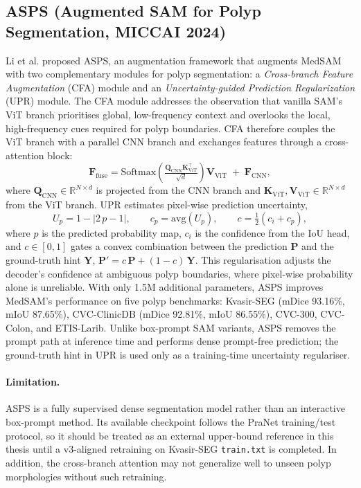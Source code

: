 \subsection{ASPS (Augmented SAM for Polyp Segmentation, MICCAI 2024)}

Li et al. \cite{li2024asps} proposed ASPS, an augmentation framework that augments MedSAM with two complementary modules for polyp segmentation: a \emph{Cross-branch Feature Augmentation} (CFA) module and an \emph{Uncertainty-guided Prediction Regularization} (UPR) module. The CFA module addresses the observation that vanilla SAM's ViT branch prioritises global, low-frequency context and overlooks the local, high-frequency cues required for polyp boundaries. CFA therefore couples the ViT branch with a parallel CNN branch and exchanges features through a cross-attention block:
\begin{equation}
  \mathbf{F}_{\mathrm{fuse}} = \mathrm{Softmax}\!\left(\tfrac{\mathbf{Q}_{\mathrm{CNN}}\mathbf{K}_{\mathrm{ViT}}^{\top}}{\sqrt{d}}\right)\mathbf{V}_{\mathrm{ViT}} \;+\; \mathbf{F}_{\mathrm{CNN}},
  \label{eq:cfa-attn}
\end{equation}
where $\mathbf{Q}_{\mathrm{CNN}}\!\in\!\mathbb{R}^{N\times d}$ is projected from the CNN branch and $\mathbf{K}_{\mathrm{ViT}},\mathbf{V}_{\mathrm{ViT}}\!\in\!\mathbb{R}^{N\times d}$ from the ViT branch. UPR estimates pixel-wise prediction uncertainty,
\begin{equation}
  U_{p} = 1 - \bigl| 2\,p - 1 \bigr|,\qquad
  c_{p} = \mathrm{avg}(U_{p}), \qquad
  c = \tfrac{1}{2}(c_{i} + c_{p}),
  \label{eq:upr}
\end{equation}
where $p$ is the predicted probability map, $c_{i}$ is the confidence from the IoU head, and $c\!\in\![0,1]$ gates a convex combination between the prediction $\mathbf{P}$ and the ground-truth hint $\mathbf{Y}$, $\mathbf{P}'=c\,\mathbf{P}+(1-c)\,\mathbf{Y}$. This regularisation adjusts the decoder's confidence at ambiguous polyp boundaries, where pixel-wise probability alone is unreliable. With only 1.5M additional parameters, ASPS improves MedSAM's performance on five polyp benchmarks: Kvasir-SEG (mDice 93.16\%, mIoU 87.65\%), CVC-ClinicDB (mDice 92.81\%, mIoU 86.55\%), CVC-300, CVC-Colon, and ETIS-Larib. Unlike box-prompt SAM variants, ASPS removes the prompt path at inference time and performs dense prompt-free prediction; the ground-truth hint in UPR is used only as a training-time uncertainty regulariser.

\paragraph{Limitation.} ASPS is a fully supervised dense segmentation model rather than an interactive box-prompt method. Its available checkpoint follows the PraNet training/test protocol, so it should be treated as an external upper-bound reference in this thesis until a v3-aligned retraining on Kvasir-SEG \texttt{train.txt} is completed. In addition, the cross-branch attention may not generalize well to unseen polyp morphologies without such retraining.


